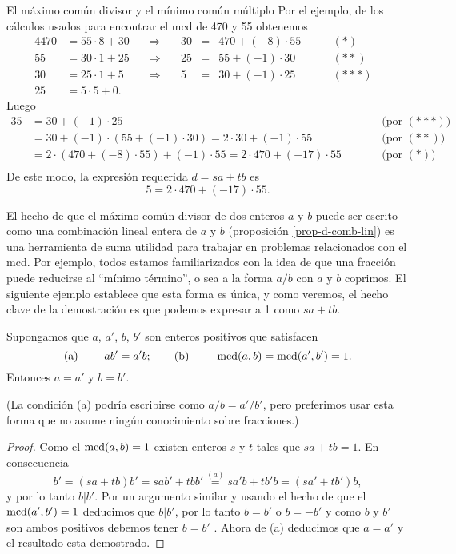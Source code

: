 \begin{section}{El máximo común divisor y el mínimo común
múltiplo}
Por el ejemplo, de los cálculos usados para encontrar el mcd de 470 y 55 obtenemos
\begin{alignat*}4
470&=55 \cdot 8 +30&\quad\Rightarrow\quad &30 &=&470 + (-8)\cdot 55&\qquad (*)&\\
55&=30 \cdot 1 + 25&\quad\Rightarrow\quad &25 &=&55 +(-1)\cdot 30&\qquad (**)&\\
30&=25 \cdot 1+5&\quad\Rightarrow\quad &5 &=&30 +(-1) \cdot 25&\qquad (***)& \\
25&=5\cdot 5+0.&&&&&&
\end{alignat*}
Luego
\begin{alignat*}3
5 &= 30 +(-1) \cdot 25& &\qquad \text{(por $(***)$)} && \\
&= 30 + (-1) \cdot (55 +(-1)\cdot 30) = 2 \cdot 30 + (-1) \cdot 55& &\qquad \text{(por $(**)$)}&& \\   
&=  2 \cdot (470 + (-8)\cdot 55) + (-1) \cdot 55 = 2 \cdot 470 +(-17)\cdot 55& &\qquad \text{(por $(*)$)}&&\\    
\end{alignat*}
De este modo, la expresión requerida $d=sa+tb$ es
$$
5=2 \cdot 470 +(-17)\cdot 55.
$$

















El hecho  de que el máximo común divisor de dos enteros $a$ y $b$ puede ser escrito como una combinación lineal entera de $a$ y $b$  (proposición \ref{prop-d-comb-lin}) es una herramienta de suma utilidad para trabajar en problemas relacionados con el mcd. Por ejemplo, todos estamos familiarizados
con la idea de que una fracción puede reducirse al ``mínimo
término'', o sea a la forma $a/b$ con $a$ y $b$ coprimos. El
siguiente ejemplo establece que esta forma es única, y como
veremos, el hecho clave de la demostración es que podemos expresar
a 1 como $sa+tb$.

\begin{ejemplo} Supongamos que $a$, $a'$, $b$, $b'$ son enteros
positivos que satisfacen
$$
\text{(a) }\qquad ab'=a'b; \qquad\text{(b) }\qquad\operatorname{mcd}(a,b)=\operatorname{mcd}(a',b')=1.
$$
Entonces $a=a'$ y $b=b' $.

(La condición ({a}) podría escribirse como $a/b=a'/b'$, pero
preferimos usar esta forma que no asume ningún conocimiento sobre
fracciones.)
\end{ejemplo}
\begin{proof} Como el $\operatorname{mcd} (a,b) =1$ existen enteros $s$ y $t$
tales que $sa+tb=1$. En consecuencia
$$
b'=(sa+tb)b' =sab'+tbb' \overset{(a)}{=} sa'b + tb'b = (sa'+tb')b,
$$
y por lo tanto $b|b'$. Por un argumento similar y usando el hecho
de que el $\operatorname{mcd}(a',b')=1 $ deducimos que $b|b'$, por lo tanto
$b=b'$ o $b=-b'$ y como $b $ y $b'$ son ambos positivos debemos
tener $b=b'$ . Ahora de (a) deducimos que $a=a'$ y el resultado
esta demostrado.
\end{proof}



\end{section}
